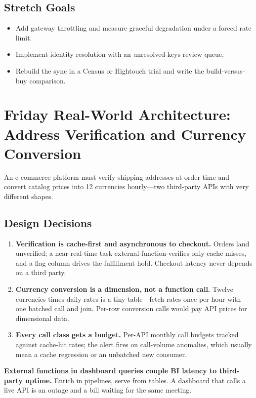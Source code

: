 \subsection*{Stretch Goals}
\begin{itemize}
    \item Add gateway throttling and measure graceful degradation under a forced rate limit.
    \item Implement identity resolution with an unresolved-keys review queue.
    \item Rebuild the sync in a Census or Hightouch trial and write the build-versus-buy comparison.
\end{itemize}

\section{Friday Real-World Architecture: Address Verification and Currency Conversion}
An e-commerce platform must verify shipping addresses at order time and convert catalog prices into 12 currencies hourly---two third-party APIs with very different shapes.

\subsection{Design Decisions}
\begin{enumerate}
    \item \textbf{Verification is cache-first and asynchronous to checkout.} Orders land unverified; a near-real-time task external-function-verifies only cache misses, and a flag column drives the fulfillment hold. Checkout latency never depends on a third party.
    \item \textbf{Currency conversion is a dimension, not a function call.} Twelve currencies times daily rates is a tiny table---fetch rates once per hour with one batched call and join. Per-row conversion calls would pay API prices for dimensional data.
    \item \textbf{Every call class gets a budget.} Per-API monthly call budgets tracked against cache-hit rates; the alert fires on call-volume anomalies, which usually mean a cache regression or an unbatched new consumer.
\end{enumerate}

\begin{pitfall}
\textbf{External functions in dashboard queries couple BI latency to third-party uptime.} Enrich in pipelines, serve from tables. A dashboard that calls a live API is an outage and a bill waiting for the same meeting.
\end{pitfall}

